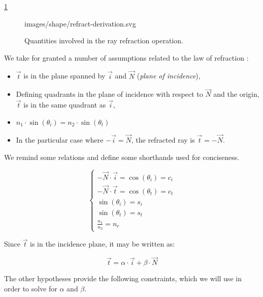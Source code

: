 \cref{fig:refract-derivation}
\begin{figure} \caption{\label{fig:refract-derivation} Quantities involved
in the ray refraction operation.}

           {images/shape/refract-derivation.svg}
\end{figure}

We take for granted a number of assumptions related to the law of refraction
\cite{wiki:snell-refraction}:

\begin{itemize}
\item $\overrightarrow{t}$ is in the plane spanned by $\overrightarrow{i}$
and $\overrightarrow{N}$ (\emph{plane of incidence}),
\item Defining quadrants in the plane of incidence with respect to
$\overrightarrow{N}$ and the origin, $\overrightarrow{t}$ is in
the same quadrant as $\overrightarrow{i}$,
\item $n_1 \cdot \sin(\theta_i) = n_2 \cdot \sin(\theta_t)$
\item In the particular case where $-\overrightarrow{i} = \overrightarrow{N}$,
      the refracted ray is $\overrightarrow{t} = - \overrightarrow{N}$.
\end{itemize}

We remind some relations and define some shorthands used for conciseness.

\begin{equation} \begin{cases}
- \overrightarrow{N} \cdot \overrightarrow{i} = \cos(\theta_i) = c_i \\
- \overrightarrow{N} \cdot \overrightarrow{t} = \cos(\theta_t) = c_t \\
\sin(\theta_i) = s_i \\
\sin(\theta_t) = s_t \\
\frac{n_1}{n_2} = n_r
\end{cases} \end{equation}

Since $\overrightarrow{t}$ is in the incidence plane, it may be written as:

\begin{equation}
\overrightarrow{t} = \alpha \cdot \overrightarrow{i}
                     + \beta \cdot \overrightarrow{N}
\end{equation}

The other hypotheses provide the following constraints, which we will use
in order to solve for $\alpha$ and $\beta$.

